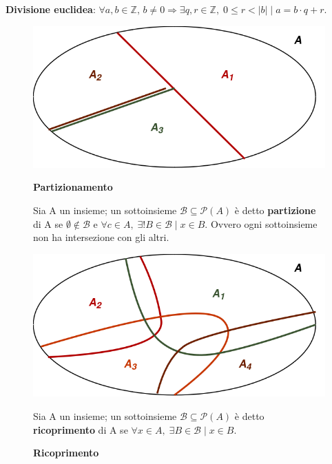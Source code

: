 \begin{boxA}
    \textbf{Divisione euclidea}: $\forall a,b \in \mathbb{Z}, \, b \neq 0 \Rightarrow \exists q,r \in \mathbb{Z}, \; 0 \leq r < |b| \; | \; a = b \cdot q + r$.
\end{boxA}

\begin{figure}[h]
    \centering
    \begin{minipage}[t]{0.45\textwidth}
        \centering
        \includegraphics[width=\textwidth]{img/partizionamento}
        \caption{\textbf{Partizionamento}}

        \begin{flushleft}
            Sia A un insieme; un sottoinsieme $\mathcal{B} \subseteq \mathcal{P}(A)$ è detto \textbf{partizione} di A se $\emptyset \notin \mathcal{B}$ e $\forall c \in A, \; \exists ! B \in \mathcal{B} \; | \; x \in B$. Ovvero ogni sottoinsieme non ha intersezione con gli altri.
        \end{flushleft}
    \end{minipage}
    \begin{minipage}[t]{0.45\textwidth}
        \centering
        \includegraphics[width=\textwidth]{img/ricoprimento}
        \caption{\textbf{Ricoprimento}}

        \begin{flushleft}
            Sia A un insieme; un sottoinsieme $\mathcal{B} \subseteq \mathcal{P}(A)$ è detto \textbf{ricoprimento} di A se $\forall x \in A, \; \exists B \in \mathcal{B} \; | \; x \in B$.
        \end{flushleft}
    \end{minipage}
\end{figure}

